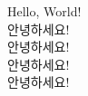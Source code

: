 \documentclass[12pt]{article}
\begin{document}
	Hello, World!\\
	\large{안녕하세요!}\\
	\Large{안녕하세요!}\\
	\huge{안녕하세요!}\\
	\Huge{안녕하세요!}
\end{document}
